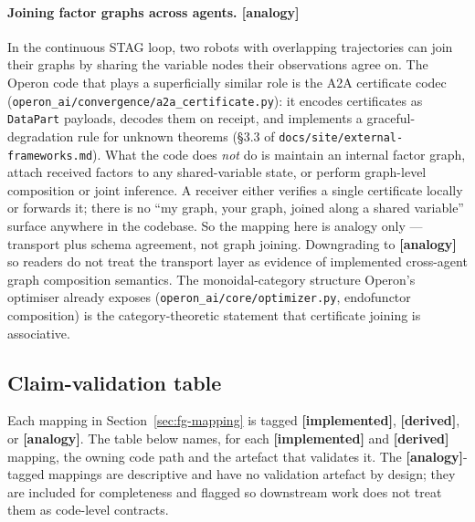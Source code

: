 \paragraph{Joining factor graphs across agents. [analogy]}
In the continuous STAG loop, two robots with overlapping
trajectories can join their graphs by sharing the variable nodes
their observations agree on.  The Operon code that plays a
superficially similar role is the A2A certificate codec
(\texttt{operon\_ai/convergence/a2a\_certificate.py}): it encodes
certificates as \texttt{DataPart} payloads, decodes them on
receipt, and implements a graceful-degradation rule for unknown
theorems (\S3.3 of \texttt{docs/site/external-frameworks.md}).
What the code does \emph{not} do is maintain an internal factor
graph, attach received factors to any shared-variable state, or
perform graph-level composition or joint inference.  A receiver
either verifies a single certificate locally or forwards it; there
is no ``my graph, your graph, joined along a shared variable''
surface anywhere in the codebase.  So the mapping here is analogy
only --- transport plus schema agreement, not graph joining.
Downgrading to \textbf{[analogy]} so readers do not treat the
transport layer as evidence of implemented cross-agent graph
composition semantics.  The
monoidal-category structure Operon's optimiser already exposes
(\texttt{operon\_ai/core/optimizer.py}, endofunctor composition) is
the category-theoretic statement that certificate joining is
associative.

\subsection{Claim-validation table}\label{sec:fg-validation}

Each mapping in Section~\ref{sec:fg-mapping} is tagged
\textbf{[implemented]}, \textbf{[derived]}, or \textbf{[analogy]}.
The table below names, for each \textbf{[implemented]} and
\textbf{[derived]} mapping, the owning code path and the artefact
that validates it.  The \textbf{[analogy]}-tagged mappings are
descriptive and have no validation artefact by design; they are
included for completeness and flagged so downstream work does not
treat them as code-level contracts.

